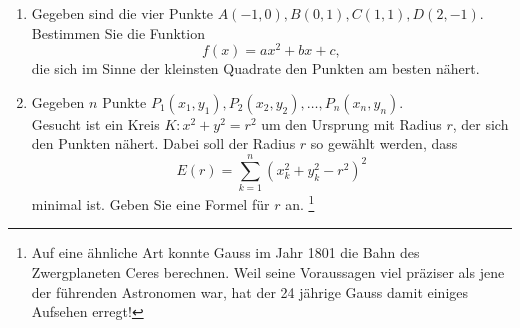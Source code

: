 \begin{ueb}
{}{}
\begin{enumerate}


    
    
    
    \item Gegeben sind die vier Punkte \( A(-1 , 0), B(0 , 1), C(1 , 1), D(2 , -1) \).  
    Bestimmen Sie die Funktion
    $$f(x) = ax^2+bx+c ,$$
    die sich im Sinne der kleinsten Quadrate den Punkten am besten nähert.

    \item Gegeben \( n \) Punkte \( P_1 (x_1 , y_1), P_2 (x_2 , y_2), \dots, P_n (x_n , y_n) \).  \\ 
    Gesucht ist ein Kreis \( K: x^2 + y^2 = r^2 \) um den Ursprung mit Radius \( r \), der sich den Punkten nähert. Dabei soll der Radius \( r \) so gewählt werden, dass  
    \[
    E(r) = \sum_{k=1}^n \left( x_k^2 + y_k^2 - r^2 \right)^2
    \]
    minimal ist. Geben Sie eine Formel für \( r \) an. \footnote{Auf eine ähnliche Art konnte Gauss im Jahr 1801 die Bahn des Zwergplaneten Ceres berechnen. Weil seine Voraussagen viel präziser als jene der führenden Astronomen war, hat der 24 jährige Gauss damit einiges Aufsehen erregt!}
\end{enumerate}
    
\end{ueb}

